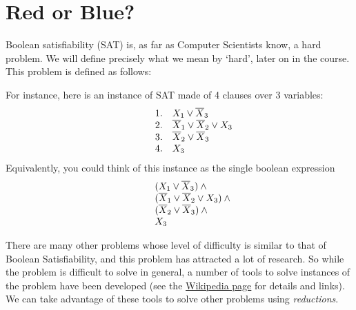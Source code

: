 \section{Red or Blue?}

Boolean satisfiability (SAT)  is, as far as  Computer Scientists know, a  hard problem. We
will define precisely what we mean by `hard', later on in the course. This problem is defined
as follows:
\begin{center}
\end{center}
For instance, here is an instance of SAT made of 4 clauses over 3 variables:
\begin{displaymath}
  \begin{array}{rrl}
    \hbox to 20pt{\hfil} & 1. & X_1 \lor \overline{X}_3 \\
    & 2. & \overline{X}_1 \lor \overline{X}_2 \lor X_3 \\
    & 3. & \overline{X}_2 \lor \overline{X}_3 \\
    & 4. & X_3 \\
  \end{array}
\end{displaymath}
Equivalently, you could think of this instance as the single boolean expression
\begin{displaymath}
  \begin{array}{rl}
    \hbox to 20pt{\hfil} & (X_1 \lor \overline{X}_3) \land {}\\
    & (\overline{X}_1 \lor \overline{X}_2 \lor X_3) \land {}\\
    & (\overline{X}_2 \lor \overline{X}_3) \land {}\\
    & X_3 \\
  \end{array}
\end{displaymath}

There are  many other problems  whose level  of difficulty is  similar to that  of Boolean
Satisfiability, and this problem has attracted a  lot of research. So while the problem is
difficult to solve  in general, a number of  tools to solve instances of  the problem have
been                       developed                        (see                       the
\href{https://en.wikipedia.org/wiki/Boolean_satisfiability_problem}  {Wikipedia page}  for
details and  links). We can take  advantage of these  tools to solve other  problems using
\emph{reductions}.

